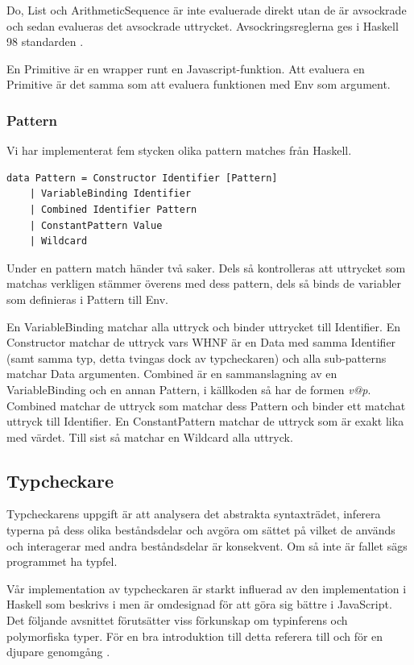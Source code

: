 Do, List och ArithmeticSequence är inte evaluerade direkt utan de är avsockrade och sedan evalueras det avsockrade uttrycket. Avsockringsreglerna ges i Haskell 98 standarden \citep{haskell98chap3}.

En Primitive är en wrapper runt en Javascript-funktion. Att evaluera en Primitive är det samma som att evaluera funktionen med Env som argument.

\subsubsection{Pattern}
Vi har implementerat fem stycken olika pattern matches från Haskell.
\begin{lstlisting}
data Pattern = Constructor Identifier [Pattern]
    | VariableBinding Identifier
    | Combined Identifier Pattern
    | ConstantPattern Value
    | Wildcard
\end{lstlisting}
Under en pattern match händer två saker. Dels så kontrolleras att uttrycket som matchas verkligen stämmer överens med dess pattern, dels så binds de variabler som definieras i Pattern till Env. 

En VariableBinding matchar alla uttryck och binder uttrycket till Identifier. En Constructor matchar de uttryck vars WHNF är en Data med samma Identifier (samt samma typ, detta tvingas dock av typcheckaren) och alla sub-patterns matchar Data argumenten. Combined är en sammanslagning av en VariableBinding och en annan Pattern, i källkoden så har de formen \emph{v@p}. Combined matchar de uttryck som matchar dess Pattern och binder ett matchat uttryck till Identifier. En ConstantPattern matchar de uttryck som är exakt lika med värdet. Till sist så matchar en Wildcard alla uttryck.

\subsection{Typcheckare} 
Typcheckarens uppgift är att analysera det abstrakta syntaxträdet, inferera typerna på dess olika
beståndsdelar och avgöra om sättet på vilket de används och interagerar med
andra beståndsdelar är konsekvent. Om så inte är fallet sägs programmet ha
typfel.

Vår implementation av typcheckaren är starkt influerad av den implementation i Haskell som beskrivs i \citep{jones99} men är omdesignad för att göra sig bättre i JavaScript. Det följande avsnittet förutsätter viss förkunskap om typinferens och polymorfiska typer. För en bra introduktion till detta referera till \citep{dragonbookchap6} och för en djupare genomgång \citep{pierce02}.

